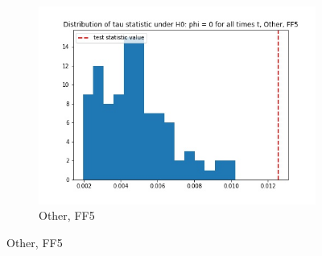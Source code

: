 \documentclass{article}
\begin{document}
\begin{figure}
\begin{subfigure}[b]{0.3\textwidth}
    \includegraphics[width=\textwidth]{Other/tau_hist_02_FF5.jpg}
    \caption{Other, FF5}
    \label{fig:2}
  \end{subfigure}
  \end{figure}
\end{document}
